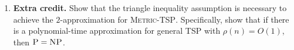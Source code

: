 \documentclass[11pt]{article}
\newcommand{\prob}[1]{\textsc{#1}\xspace}
\newcommand{\tsp}{\prob{TSP}}
\newcommand{\metrictsp}{\prob{Metric-TSP}}
\newcommand{\np}{\textsc{NP}\xspace}
\newcommand{\p}{\textsc{P}\xspace}
\begin{document}
\begin{enumerate}
  \item {\bf Extra credit.}
    Show that the triangle inequality assumption is necessary to
    achieve the $2$-approximation for \metrictsp.  Specifically, show
    that if there is a polynomial-time approximation for general \tsp
    with $\rho(n)=O(1)$, then $\p = \np$.
\end{enumerate}
\end{document}
